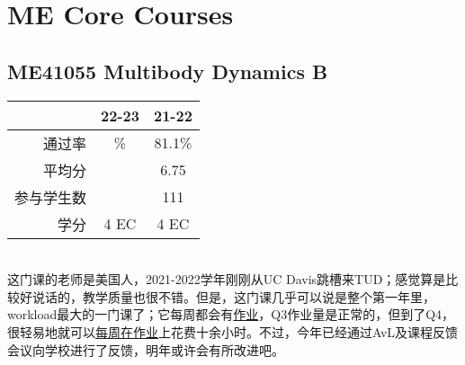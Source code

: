 \vspace{\betsubsec} %
\section{ME Core Courses}
\subsection{ME41055 Multibody Dynamics B}
\begin{minipage}{0.45\textwidth}
\centering
{}
\end{minipage}%
\begin{minipage}{0.45\textwidth}
\raggedleft
\begin{tabular}{r|c|c}
\textbf{ } & \textbf{22-23} & \textbf{21-22}\\ \hline
通过率 & \% & 81.1\%\\ 
平均分 &   & 6.75\\ 
参与学生数 &  & 111\\
学分 & 4 EC & 4 EC\\
\end{tabular}
\end{minipage}\\

这门课的老师是美国人，2021-2022学年刚刚从UC Davis跳槽来TUD；感觉算是比较好说话的，教学质量也很不错。但是，这门课几乎可以说是整个第一年里，workload最大的一门课了；它每周都会有\href{https://drive.google.com/file/d/1bz5jCnF8Walknjwm1NXwLhsIZyFFHFMX/view?usp=sharing}{作业}，Q3作业量是正常的，但到了Q4，很轻易地就可以\href{https://drive.google.com/file/d/1bz5jCnF8Walknjwm1NXwLhsIZyFFHFMX/view?usp=sharing}{每周在作业}上花费十余小时。不过，今年已经通过AvL及课程反馈会议向学校进行了反馈，明年或许会有所改进吧。

